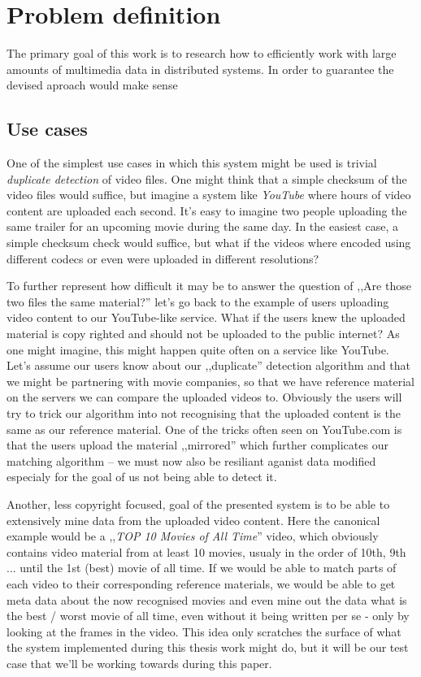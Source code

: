 \chapter{Problem definition}
The primary goal of this work is to research how to efficiently work with large amounts of multimedia data in distributed systems. 
In order to guarantee the devised aproach would make sense

\section{Use cases}

One of the simplest use cases in which this system might be used is trivial \textit{duplicate detection} of video files.
One might think that a simple checksum of the video files would suffice, but imagine a system like \textit{YouTube} where hours of video content are uploaded 
each second. It's easy to imagine two people uploading the same trailer for an upcoming movie during the same day. In the easiest case, a simple checksum
check would suffice, but what if the videos where encoded using different codecs or even were uploaded in different resolutions?

To further represent how difficult it may be to answer the question of ,,Are those two files the same material?'' let's go back to the example of users
uploading video content to our YouTube-like service. What if the users knew the uploaded material is copy righted and should not be uploaded to the public
internet? As one might imagine, this might happen quite often on a service like YouTube. Let's assume our users know about our ,,duplicate'' detection
algorithm and that we might be partnering with movie companies, so that we have reference material on the servers we can compare the uploaded videos to.
Obviously the users will try to trick our algorithm into not recognising that the uploaded content is the same as our reference material. One of the tricks
often seen on YouTube.com is that the users upload the material ,,mirrored'' which further complicates our matching algorithm -- we must now also be 
resiliant aganist data modified especialy for the goal of us not being able to detect it.

Another, less copyright focused, goal of the presented system is to be able to extensively mine data from the uploaded video content.
Here the canonical example would be a ,,\textit{TOP 10 Movies of All Time}'' video, which obviously contains video material from at least 10 movies,
usualy in the order of 10th, 9th ... until the 1st (best) movie of all time. If we would be able to match parts of each video to their corresponding 
reference materials, we would be able to get meta data about the now recognised movies and even mine out the data what is the best / worst movie of all time,
even without it being written per se - only by looking at the frames in the video. This idea only scratches the surface of what the system implemented during
this thesis work might do, but it will be our test case that we'll be working towards during this paper.

